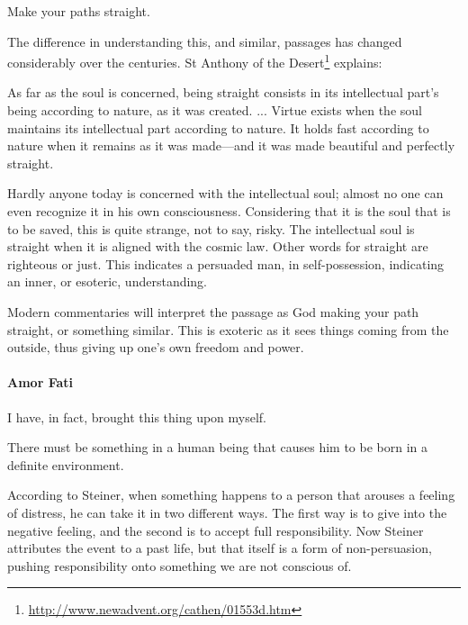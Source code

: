\begin{quotex}
Make your paths straight. 
\end{quotex}


The difference in understanding this, and similar, passages has changed considerably over the centuries. St Anthony of the Desert\footnote{\url{http://www.newadvent.org/cathen/01553d.htm}} explains:

\begin{quotex}
As far as the soul is concerned, being straight consists in its intellectual part's being according to nature, as it was created. ... Virtue exists when the soul maintains its intellectual part according to nature. It holds fast according to nature when it remains as it was made---and it was made beautiful and perfectly straight.
\end{quotex}


Hardly anyone today is concerned with the intellectual soul; almost no one can even recognize it in his own consciousness. Considering that it is the soul that is to be saved, this is quite strange, not to say, risky. The intellectual soul is straight when it is aligned with the cosmic law. Other words for straight are righteous or just. This indicates a persuaded man, in self-possession, indicating an inner, or esoteric, understanding.

Modern commentaries will interpret the passage as God making your path straight, or something similar. This is exoteric as it sees things coming from the outside, thus giving up one's own freedom and power.

\paragraph{Amor Fati}


\begin{quotex}
I have, in fact, brought this thing upon myself.

There must be something in a human being that causes him to be born in a definite environment.  
\end{quotex}


According to Steiner, when something happens to a person that arouses a feeling of distress, he can take it in two different ways. The first way is to give into the negative feeling, and the second is to accept full responsibility. Now Steiner attributes the event to a past life, but that itself is a form of non-persuasion, pushing responsibility onto something we are not conscious of.

